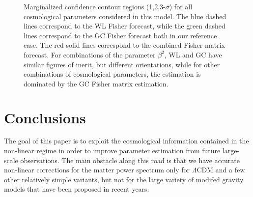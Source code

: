 \begin{figure}
%
\centering{}
\caption[Fisher confidence regions for GC and WL in the CDE model.]{\label{fig:Contour-regions} Marginalized confidence contour regions
(1,2,3-$\sigma$) for all cosmological parameters considered in this
model. The blue dashed lines correspond to the WL Fisher forecast,
while the green dashed lines correspond to the GC Fisher forecast
both in our reference case. The red solid lines correspond to the
combined Fisher matrix forecast. For combinations of the parameter
$\beta^{2}$, WL and GC have similar figures of merit, but different
orientations, while for other combinations of cosmological parameters,
the estimation is dominated by the GC Fisher matrix estimation.}
\end{figure}



\section{Conclusions}

The goal of this paper is to exploit the cosmological information
contained in the non-linear regime in order to improve parameter estimation
from future large-scale observations. The main obstacle along this
road is that we have accurate non-linear corrections for the matter
power spectrum only for $\Lambda$CDM and a few other relatively simple
variants, but not for the large variety of modifed gravity models
that have been proposed in recent years.

